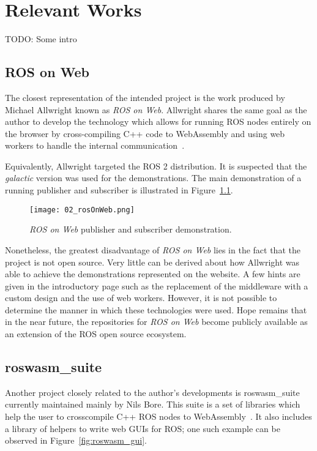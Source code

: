 \chapter{Relevant Works}

    TODO: Some intro


    \section{ROS on Web}

        The closest representation of the intended project is the work produced by Michael Allwright known as \textit{ROS on Web}. Allwright shares the same goal as the author to develop the technology which allows for running ROS nodes entirely on the browser by cross-compiling C++ code to WebAssembly and using web workers to handle the internal communication~\cite{rosonweb}.

        Equivalently, Allwright targeted the \ac{ROS} 2 distribution. It is suspected that the \textit{galactic} version was used for the demonstrations. The main demonstration of a running publisher and subscriber is illustrated in Figure~\ref{fig:rosonweb}.
        
        
        \begin{figure}[htbp]
            \centering
            \texttt{[image: 02\_rosOnWeb.png]}
            \caption{\textit{ROS on Web} publisher and subscriber demonstration.}
            \label{fig:rosonweb}
        \end{figure}

        Nonetheless, the greatest disadvantage of \textit{ROS on Web} lies in the fact that the project is not open source. Very little can be derived about how Allwright was able to achieve the demonstrations represented on the website. A few hints are given in the introductory page such as the replacement of the middleware with a custom design and the use of web workers. However, it is not possible to determine the manner in which these technologies were used. Hope remains that in the near future, the repositories for \textit{ROS on Web} become publicly available as an extension of the ROS open source ecosystem.

    \section{roswasm\_suite}

        Another project closely related to the author's developments is \textsf{roswasm\_suite} currently maintained mainly by Nils Bore. This suite is a set of libraries which help the user to cross\-compile C++ ROS nodes to WebAssembly~\cite{roswasmsuite}. It also includes a library of helpers to write web \ac{GUI}s for ROS; one such example can be observed in Figure~\ref{fig:roswasm_gui}.

